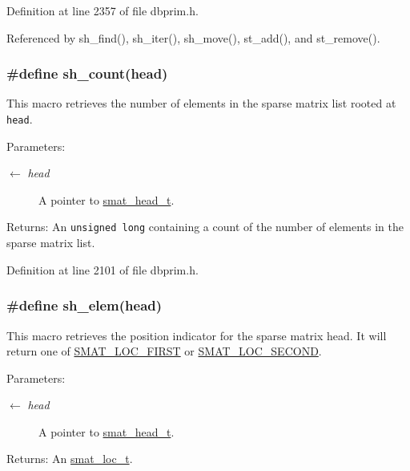 Definition at line 2357 of file dbprim.h.

Referenced by sh\_\-find(), sh\_\-iter(), sh\_\-move(), st\_\-add(), and st\_\-remove().\hypertarget{group__dbprim__smat_ga47}{
\subsubsection[sh\_\-count]{\setlength{\rightskip}{0pt plus 5cm}\#define sh\_\-count(head)}}
\label{group__dbprim__smat_ga47}


This macro retrieves the number of elements in the sparse matrix list rooted at {\tt head}.

\begin{Desc}
\item[Parameters:]
\begin{description}
\item[\mbox{$\leftarrow$} {\em head}]A pointer to \hyperlink{group__dbprim__smat_ga1}{smat\_\-head\_\-t}.\end{description}
\end{Desc}
\begin{Desc}
\item[Returns:]An {\tt unsigned long} containing a count of the number of elements in the sparse matrix list.\end{Desc}


Definition at line 2101 of file dbprim.h.\hypertarget{group__dbprim__smat_ga44}{
\subsubsection[sh\_\-elem]{\setlength{\rightskip}{0pt plus 5cm}\#define sh\_\-elem(head)}}
\label{group__dbprim__smat_ga44}


This macro retrieves the position indicator for the sparse matrix head. It will return one of \hyperlink{group__dbprim__smat_gga70a137}{SMAT\_\-LOC\_\-FIRST} or \hyperlink{group__dbprim__smat_gga70a138}{SMAT\_\-LOC\_\-SECOND}.

\begin{Desc}
\item[Parameters:]
\begin{description}
\item[\mbox{$\leftarrow$} {\em head}]A pointer to \hyperlink{group__dbprim__smat_ga1}{smat\_\-head\_\-t}.\end{description}
\end{Desc}
\begin{Desc}
\item[Returns:]An \hyperlink{group__dbprim__smat_ga6}{smat\_\-loc\_\-t}.\end{Desc}


